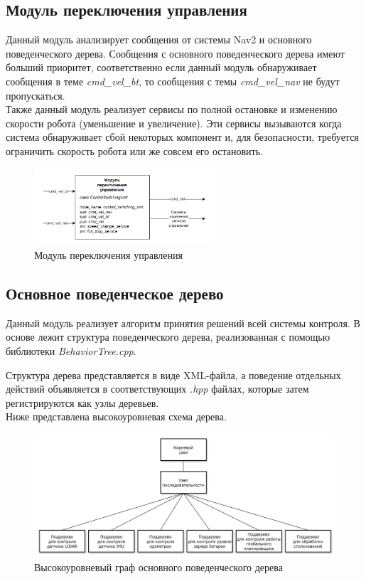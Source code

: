 \subsection{Модуль переключения управления}

Данный модуль анализирует сообщения от системы Nav2 и основного поведенческого дерева. Сообщения с основного поведенческого дерева имеют больший приоритет, соответственно если данный модуль обнаруживает сообщения в теме \textit{cmd\_vel\_bt}, то сообщения с темы \textit{cmd\_vel\_nav} не будут пропускаться. \\
Также данный модуль реализует сервисы по полной остановке и изменению скорости робота (уменьшение и увеличение). Эти сервисы вызываются когда система обнаруживает сбой некоторых компонент и, для безопасности, требуется ограничить скорость робота или же совсем его остановить.

\begin{figure}[h]
    \centering
    \includegraphics[width=0.6\textwidth]{images/chap_3/control_switching_unit.png}
    \caption{Модуль переключения управления}
    \label{fig:control_switching_unit}
\end{figure}

\subsection{Основное поведенческое дерево}

Данный модуль реализует алгоритм принятия решений всей системы контроля. В основе лежит структура поведенческого дерева, реализованная с помощью библиотеки \textit{BehaviorTree.cpp}.

Структура дерева представляется в виде XML-файла, а поведение отдельных действий объявляется в соответствующих \textit{.hpp} файлах, которые затем регистрируются как узлы деревьев. \\
Ниже представлена высокоуровневая схема дерева.

\begin{figure}[h]
    \centering
    \includegraphics[width=1.0\textwidth]{images/chap_3/subtrees_overview.png}
    \caption{Высокоуровневый граф основного поведенческого дерева}
    \label{fig:subtrees_overview}
\end{figure}

